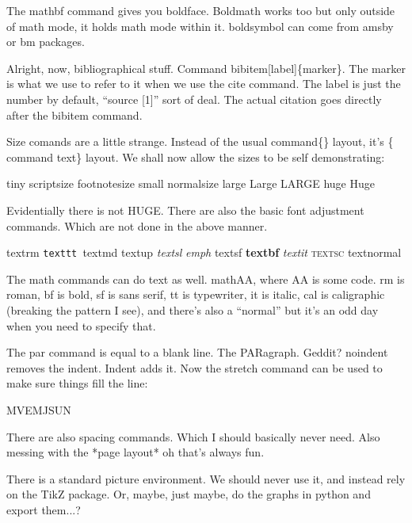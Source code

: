 \documentclass{article}
\begin{document}
The mathbf command gives you boldface. Boldmath works too but only outside of math mode, it holds math mode within it. boldsymbol can come from amsby or bm packages. 

Alright, now, bibliographical stuff. Command bibitem[label]\{marker\}. The marker is what we use to refer to it when we use the cite command. The label is just the number by default, ``source [1]'' sort of deal. The actual citation goes directly after the bibitem command. 

Size comands are a little strange. Instead of the usual command\{\} layout, it's \{ command text\} layout. We shall now allow the sizes to be self demonstrating:

{\tiny tiny }{\scriptsize scriptsize }{\footnotesize footnotesize }{\small small }{\normalsize normalsize }{\large large }{\Large Large }{\LARGE LARGE }{\huge huge }{\Huge Huge }

Evidentially there is not HUGE. There are also the basic font adjustment commands. Which are not done in the above manner.

\textrm{textrm }\texttt{texttt }\textmd{textmd }\textup{textup }\textsl{textsl }\emph{emph }\textsf{textsf }\textbf{textbf }\textit{textit }\textsc{textsc }\textnormal{textnormal }

The math commands can do text as well. mathAA, where AA is some code. rm is roman, bf is bold, sf is sans serif, tt is typewriter, it is italic, cal is caligraphic (breaking the pattern I see), and there's also a ``normal'' but it's an odd day when you need to specify that. 

The par command is equal to a blank line. The PARagraph. Geddit? noindent removes the indent. Indent adds it. Now the stretch command can be used to make sure things fill the line:

MVEMJSUN

There are also spacing commands. Which I should basically never need. Also messing with the *page layout* oh that's always fun.

There is a standard picture environment. We should never use it, and instead rely on the TikZ package. Or, maybe, just maybe, do the graphs in python and export them...?
\end{document}
